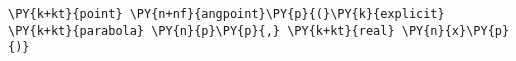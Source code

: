 \begin{Verbatim}[commandchars=\\\{\}]
    \PY{k+kt}{point} \PY{n+nf}{angpoint}\PY{p}{(}\PY{k}{explicit} \PY{k+kt}{parabola} \PY{n}{p}\PY{p}{,} \PY{k+kt}{real} \PY{n}{x}\PY{p}{)}
\end{Verbatim}

